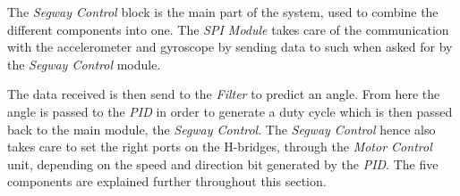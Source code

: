 The \textit{Segway Control} block is the main part of the system, used to combine the different components into one.
The \textit{SPI Module} takes care of the communication with the accelerometer and gyroscope by sending data to such when asked for by the \textit{Segway Control} module.

The data received is then send to the \textit{Filter} to predict an angle.
From here the angle is passed to the \textit{PID} in order to generate a duty cycle which is then passed back to the main module, the \textit{Segway Control}.
The \textit{Segway Control} hence also takes care to set the right ports on the H-bridges, through the \textit{Motor Control} unit, depending on the speed and direction bit generated by the \textit{PID}.
The five components are explained further throughout this section.
